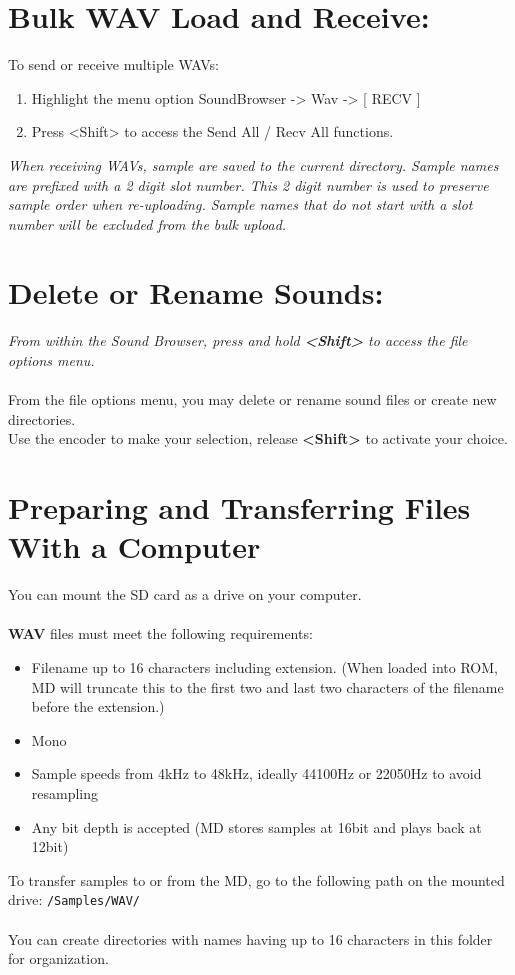 \section{Bulk WAV Load and Receive:}
To send or receive multiple WAVs:
\begin{enumerate}
\item Highlight the menu option SoundBrowser -> Wav -> [ RECV ]
\item Press <Shift> to access the Send All / Recv All functions.\\
\end{enumerate}
\textit{When receiving WAVs, sample are saved to the current directory. Sample names are prefixed with a 2 digit slot number. This 2 digit number is used to preserve sample order when re-uploading. Sample names that do not start with a slot number will be excluded from the bulk upload.}
\newpage
\section{Delete or Rename Sounds:}
\textit{From within the Sound Browser, press and hold \textbf{<Shift>} to access the file options menu.}\\\\
From the file options menu, you may delete or rename sound files or create new directories.\\
Use the encoder to make your selection, release \textbf{<Shift>} to activate your choice.
\\
\section{Preparing and Transferring Files With a Computer}
You can mount the SD card as a drive on your computer. \\
\\
\textbf{WAV} files must meet the following requirements:
\begin{itemize}
    \item Filename up to 16 characters including extension. (When loaded into ROM, MD will truncate this to the first two and last two characters of the filename before the extension.)
    \item Mono
    \item Sample speeds from 4kHz to 48kHz, ideally 44100Hz or 22050Hz to avoid resampling
    \item Any bit depth is accepted (MD stores samples at 16bit and plays back at 12bit)
\end{itemize}

To transfer samples to or from the MD, go to the following path on the mounted drive:
\texttt{/Samples/WAV/}\\
\\
You can create directories with names having up to 16 characters in this folder for organization.
\\

